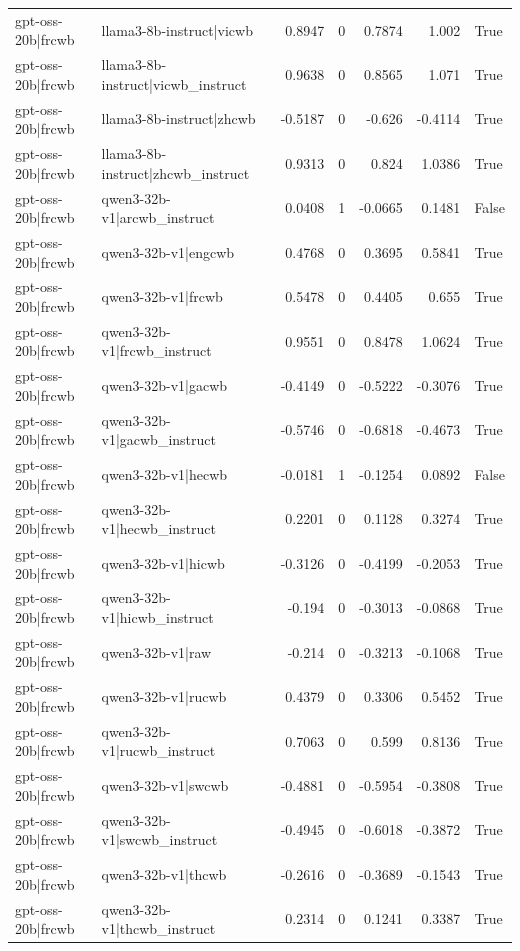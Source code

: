 \begin{table}
\begin{tabular}{l l r r r r l}
gpt-oss-20b|frcwb & llama3-8b-instruct|vicwb & 0.8947 & 0 & 0.7874 & 1.002 & True \\
gpt-oss-20b|frcwb & llama3-8b-instruct|vicwb_instruct & 0.9638 & 0 & 0.8565 & 1.071 & True \\
gpt-oss-20b|frcwb & llama3-8b-instruct|zhcwb & -0.5187 & 0 & -0.626 & -0.4114 & True \\
gpt-oss-20b|frcwb & llama3-8b-instruct|zhcwb_instruct & 0.9313 & 0 & 0.824 & 1.0386 & True \\
gpt-oss-20b|frcwb & qwen3-32b-v1|arcwb_instruct & 0.0408 & 1 & -0.0665 & 0.1481 & False \\
gpt-oss-20b|frcwb & qwen3-32b-v1|engcwb & 0.4768 & 0 & 0.3695 & 0.5841 & True \\
gpt-oss-20b|frcwb & qwen3-32b-v1|frcwb & 0.5478 & 0 & 0.4405 & 0.655 & True \\
gpt-oss-20b|frcwb & qwen3-32b-v1|frcwb_instruct & 0.9551 & 0 & 0.8478 & 1.0624 & True \\
gpt-oss-20b|frcwb & qwen3-32b-v1|gacwb & -0.4149 & 0 & -0.5222 & -0.3076 & True \\
gpt-oss-20b|frcwb & qwen3-32b-v1|gacwb_instruct & -0.5746 & 0 & -0.6818 & -0.4673 & True \\
gpt-oss-20b|frcwb & qwen3-32b-v1|hecwb & -0.0181 & 1 & -0.1254 & 0.0892 & False \\
gpt-oss-20b|frcwb & qwen3-32b-v1|hecwb_instruct & 0.2201 & 0 & 0.1128 & 0.3274 & True \\
gpt-oss-20b|frcwb & qwen3-32b-v1|hicwb & -0.3126 & 0 & -0.4199 & -0.2053 & True \\
gpt-oss-20b|frcwb & qwen3-32b-v1|hicwb_instruct & -0.194 & 0 & -0.3013 & -0.0868 & True \\
gpt-oss-20b|frcwb & qwen3-32b-v1|raw & -0.214 & 0 & -0.3213 & -0.1068 & True \\
gpt-oss-20b|frcwb & qwen3-32b-v1|rucwb & 0.4379 & 0 & 0.3306 & 0.5452 & True \\
gpt-oss-20b|frcwb & qwen3-32b-v1|rucwb_instruct & 0.7063 & 0 & 0.599 & 0.8136 & True \\
gpt-oss-20b|frcwb & qwen3-32b-v1|swcwb & -0.4881 & 0 & -0.5954 & -0.3808 & True \\
gpt-oss-20b|frcwb & qwen3-32b-v1|swcwb_instruct & -0.4945 & 0 & -0.6018 & -0.3872 & True \\
gpt-oss-20b|frcwb & qwen3-32b-v1|thcwb & -0.2616 & 0 & -0.3689 & -0.1543 & True \\
gpt-oss-20b|frcwb & qwen3-32b-v1|thcwb_instruct & 0.2314 & 0 & 0.1241 & 0.3387 & True \\

\end{tabular}
\end{table}
